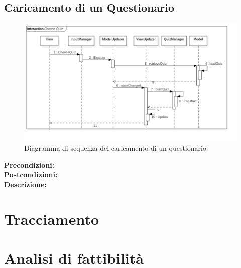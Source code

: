 \documentclass[a4paper,11pt]{article}
\begin{document}
	\subsection{Caricamento di un Questionario}
	\begin{figure}[h!]
	\begin{center}
		\includegraphics[scale=0.55]{../images/LoadQuiz.png}
		\caption{Diagramma di sequenza del caricamento di un questionario}
	\end{center}
	\end{figure}
	\textbf{Precondizioni:} \\
	\textbf{Postcondizioni:} \\
	\textbf{Descrizione:} \\
	\section{Tracciamento}
	\newpage
	\section{Analisi di fattibilità}
\end{document}
